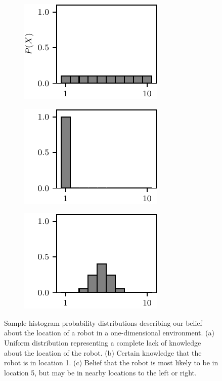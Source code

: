 \begin{figure}
  \begin{center}
    \begin{subfigure}[b]{0.3\textwidth}
      \includegraphics[]{probability/figs/uniform_hist.pdf}
      \caption{}
    \end{subfigure}
    \begin{subfigure}[b]{0.3\textwidth}
      \includegraphics[]{probability/figs/certain_hist.pdf}
      \caption{}
    \end{subfigure}
    \begin{subfigure}[b]{0.3\textwidth}
      \includegraphics[]{probability/figs/gauss_hist.pdf}
      \caption{}
    \end{subfigure}
  \end{center}
  \caption{Sample histogram probability distributions describing our
    belief about the location of a robot in a one-dimensional
    environment. (a) Uniform distribution representing a complete lack
    of knowledge about the location of the robot. (b) Certain
    knowledge that the robot is in location 1. (c) Belief that the
    robot is most likely to be in location 5, but may be in nearby
    locations to the left or right.}
  \label{fig:histograms}
\end{figure}


